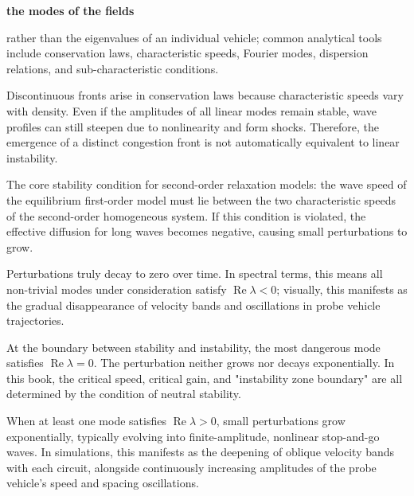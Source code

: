 \documentclass[11pt,a4paper,openany]{book}
\numberwithin{equation}{chapter}
\numberwithin{figure}{chapter}
\numberwithin{table}{chapter}
\begin{document}
\begin{description}[style=unboxed,leftmargin=0pt,labelindent=0pt,labelsep=0.5em,itemsep=0.65em,font=\normalfont\bfseries\color{navy}]
\textbf{the modes of the fields}

rather than the eigenvalues of an individual vehicle; common analytical tools include conservation laws, characteristic speeds, Fourier modes, dispersion relations, and sub-characteristic conditions.



\item[Kinematic shock]


Discontinuous fronts arise in conservation laws because characteristic speeds vary with density. Even if the amplitudes of all linear modes remain stable, wave profiles can still steepen due to nonlinearity and form shocks. Therefore, the emergence of a distinct congestion front is not automatically equivalent to linear instability.



\item[Subcharacteristic condition]


The core stability condition for second-order relaxation models: the wave speed of the equilibrium first-order model must lie between the two characteristic speeds of the second-order homogeneous system. If this condition is violated, the effective diffusion for long waves becomes negative, causing small perturbations to grow.



\item[Asymptotic stability]


Perturbations truly decay to zero over time. In spectral terms, this means all non-trivial modes under consideration satisfy $\operatorname{Re}\lambda<0$; visually, this manifests as the gradual disappearance of velocity bands and oscillations in probe vehicle trajectories.\item[Neutral stability]At the boundary between stability and instability, the most dangerous mode satisfies $\operatorname{Re}\lambda=0$. The perturbation neither grows nor decays exponentially. In this book, the critical speed, critical gain, and "instability zone boundary" are all determined by the condition of neutral stability.



\item[Instability]


When at least one mode satisfies $\operatorname{Re}\lambda>0$, small perturbations grow exponentially, typically evolving into finite-amplitude, nonlinear stop-and-go waves. In simulations, this manifests as the deepening of oblique velocity bands with each circuit, alongside continuously increasing amplitudes of the probe vehicle's speed and spacing oscillations.




\end{description}
\end{document}
